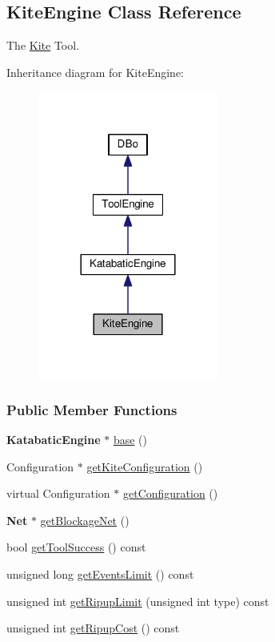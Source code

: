 \hypertarget{classKite_1_1KiteEngine}{}\subsection{Kite\+Engine Class Reference}
\label{classKite_1_1KiteEngine}


The \hyperlink{namespaceKite}{Kite} Tool.  




Inheritance diagram for Kite\+Engine\+:\nopagebreak
\begin{figure}[H]
\begin{center}
\leavevmode
\includegraphics[width=168pt]{classKite_1_1KiteEngine__inherit__graph}
\end{center}
\end{figure}
\subsubsection*{Public Member Functions}
\begin{DoxyCompactItemize}
\item 
\textbf{ Katabatic\+Engine} $\ast$ \hyperlink{classKite_1_1KiteEngine_a2313df62af32702cf749c15d349af5ea}{base} ()
\item 
Configuration $\ast$ \hyperlink{classKite_1_1KiteEngine_a1af1f95e771fba5c85a19ea2d686553a}{get\+Kite\+Configuration} ()
\item 
virtual Configuration $\ast$ \hyperlink{classKite_1_1KiteEngine_a9a7fbadfe526875680f698c76adfb128}{get\+Configuration} ()
\item 
\textbf{ Net} $\ast$ \hyperlink{classKite_1_1KiteEngine_aef6f41b0e8265ad574d1797f46ab9fa8}{get\+Blockage\+Net} ()
\item 
bool \hyperlink{classKite_1_1KiteEngine_ae88a4ccf0189655c785df38e5d75155c}{get\+Tool\+Success} () const
\item 
unsigned long \hyperlink{classKite_1_1KiteEngine_abb19e465ef249651bfc0efbe6f23ef1d}{get\+Events\+Limit} () const
\item 
unsigned int \hyperlink{classKite_1_1KiteEngine_aa9cc4f640a8b50dc1bcff8d938a09c3c}{get\+Ripup\+Limit} (unsigned int type) const
\item 
unsigned int \hyperlink{classKite_1_1KiteEngine_a1b4de41d8359251bcfbda288ec6bbbee}{get\+Ripup\+Cost} () const
\end{DoxyCompactItemize}
